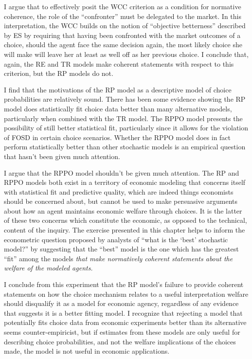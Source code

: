 \documentclass[../main.tex]{subfiles}
\begin{document}
I argue that to effectively posit the WCC criterion as a condition for normative coherence, the role of the \enquote{confronter} must be delegated to the market.
In this interpretation, the WCC builds on the notion of \enquote{objective betterness} described by ES by requiring that having been confronted with the market outcomes of a choice, should the agent face the same decision again, the most likely choice she will make will leave her at least as well off as her previous choice.
I conclude that, again, the RE and TR models make coherent statements with respect to this criterion, but the RP models do not.

I find that the motivations of the RP model as a descriptive model of choice probabilities are relatively sound.
There has been some evidence showing the RP model does statistically fit choice data better than many alternative models, particularly when combined with the TR model.
The RPPO model presents the possibility of still better statistical fit, particularly since it allows for the violation of FOSD in certain choice scenarios.{\footnotemark}
Whether the RPPO model does in fact perform statistically better than other stochastic models is an empirical question that hasn't been given much attention.

\addtocounter{footnote}{-1}

I argue that the RPPO model shouldn't be given much attention.
The RP and RPPO models both exist in a territory of economic modeling that concerns itself with statistical fit and predictive quality, which are indeed things economists should be concerned about, but cannot be used to make persuasive arguments about how an agent maintains economic welfare through choices.
It is the latter of these two concerns which constitute the economic, as opposed to the technical, content of the inquiry.
The exercise presented in this chapter helps to inform the econometric question proposed by analysts of \enquote{what is the \enquote{best} stochastic model?} by suggesting that the \enquote{best} model is the one which has the greatest \enquote{fit} among the models \textit{that make normatively coherent statements about the welfare of the modeled agents.}

I conclude from this experiment that the RP model's failure to provide coherent statements on how the choice mechanism relates to a useful interpretation welfare should disqualify it as a model for economic agency, regardless of any evidence that suggests it is a better fitting model.
I recognize that rejecting a model that potentially fits choice data from economic experiments better than its alternative seems counter-empiricist, but if estimates from these models are only useful for describing choice probabilities, and not the welfare implications of the choices made, the model is not useful in economic applications.

\newpage

\onlyinsubfile{
\newpage
\printbibliography[segment=2, heading=subbibliography]
}
\end{document}
